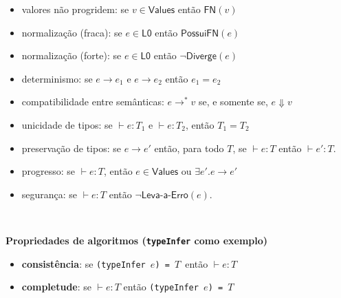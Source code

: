 \documentclass[10pt,a4paper]{article}
\begin{document}
\begin{itemize}

\item valores não progridem: se $ {v} \in \textsf{Values}$ então $\textsf{FN}(v)$

\item normalização (fraca): se ${e}\in \textsf{L0}$  então $\textsf{PossuiFN}(e)$ 

\item normalização (forte): se ${e}\in \textsf{L0}$  então $\neg \textsf{Diverge}(e)$ 
 

\item determinismo: se ${e} \longrightarrow {e}_1$ e 
${e} \longrightarrow {e}_2$
então ${e}_1={e}_2$ 



\item compatibilidade entre semânticas: ${e} \longrightarrow^* {v}$  se, e somente se,   ${e} \Downarrow {v} $
 
 
\item unicidade de tipos: se $\vdash {e} : {T}_1$ e $\vdash {e} : {T}_2$, 
então $T_1={T}_2$

 

\item preservação de tipos: se ${e} \longrightarrow  {e'}$ então, para todo  $T$, se $\vdash {e} : {T}$ então $\vdash  {e'} : {T}$.

 

\item progresso: se $\vdash {e} : {T}$, então $e \in \textsf{Values}$ ou $\exists e'. {e} \longrightarrow  {e'}$


\item segurança: se $\vdash {e} : {T}$ então $\neg \textsf{Leva-a-Erro}(e)$.

 
\end{itemize}  


\ 

\noindent \textbf{Propriedades de algoritmos (\texttt{typeInfer} como exemplo)}

\begin{itemize}
    
\item \textbf{consistência}: se \texttt{(typeInfer $e$) = $T$}\ então $\vdash e : T$ 
    
\item \textbf{completude}: se $\vdash {e} : {T}$ então \texttt{(typeInfer $e$) = $T$}

\end{itemize}
\end{document}
